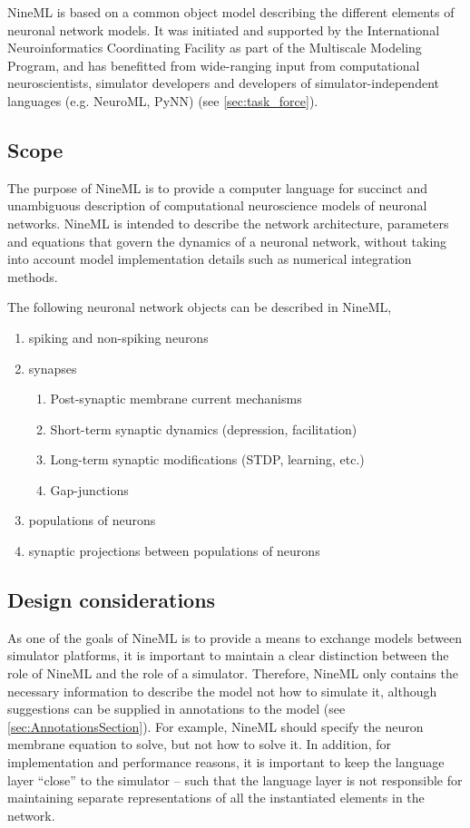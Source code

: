 \documentclass[draftspec]{ninemlspec}
\begin{document}
NineML is based on a
common object model describing the different elements of neuronal network
models. It was initiated and supported by the International
Neuroinformatics Coordinating Facility as part of the Multiscale Modeling
Program, and has benefitted from wide-ranging input from computational neuroscientists,
simulator developers and developers of simulator-independent languages (e.g. NeuroML, PyNN) (see \ref{sec:task_force}).

\subsection{Scope}
\label{sec:scope}

The purpose of NineML is to provide a computer language for
succinct and unambiguous description of computational neuroscience models of neuronal networks.
NineML is intended to describe the network architecture, parameters
and equations that govern the dynamics of a neuronal network, without
taking into account model implementation details such as numerical integration
methods.

The following neuronal network objects can be described in NineML,
\begin{enumerate}
\item spiking and non-spiking neurons
\item synapses
\begin{enumerate}
\item Post-synaptic membrane current mechanisms
\item Short-term synaptic dynamics (depression, facilitation)
\item Long-term synaptic modifications (STDP, learning, etc.)
\item Gap-junctions
\end{enumerate}
\item populations of neurons
\item synaptic projections between populations of neurons
\end{enumerate}

\subsection{Design considerations}
\label{sec:design_considerations}

As one of the goals of NineML is to provide a means to exchange models between simulator platforms, 
it is important to maintain a clear distinction
between the role of NineML and the role of a simulator. Therefore, NineML only
contains the necessary information to describe the model
not how to simulate it, although suggestions can be supplied in annotations to the model (see \ref{sec:AnnotationsSection}). 
For example, NineML should specify the neuron membrane equation to solve,
but not how to solve it.  In addition, for implementation and performance
reasons, it is important to keep the language layer ``close'' to the simulator
-- such that the language layer is not responsible for maintaining separate
representations of all the instantiated elements in the network.
\end{document}
